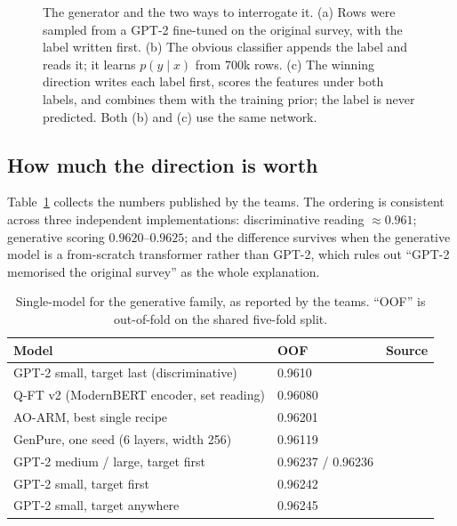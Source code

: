 \begin{figure}[t]
\caption{The generator and the two ways to interrogate it. (a) Rows were sampled from a
GPT-2 fine-tuned on the original survey, with the label written first. (b) The obvious
classifier appends the label and reads it; it learns $p(y\mid x)$ from 700k rows.
(c) The winning direction writes each label first, scores the features under both labels,
and combines them with the training prior; the label is never predicted. Both (b) and (c)
use the same network.}
\label{fig:directions}
\end{figure}


\subsection{How much the direction is worth}

Table~\ref{tab:generative} collects the numbers published by the teams. The ordering is
consistent across three independent implementations: discriminative reading $\approx0.961$;
generative scoring $0.9620$--$0.9625$; and the difference survives when the generative model
is a from-scratch transformer rather than GPT-2, which rules out ``GPT-2 memorised the
original survey'' as the whole explanation.

\begin{table}[t]
\centering
\small
\caption{Single-model \auc{} for the generative family, as reported by the teams.
``OOF'' is out-of-fold on the shared five-fold split.}
\label{tab:generative}
\begin{tabular}{lll}
\toprule
Model & OOF \auc{} & Source\\
\midrule
GPT-2 small, target last (discriminative)      & 0.9610            & \citet{kaggle_first}\\
Q-FT v2 (ModernBERT encoder, set reading)      & 0.96080           & \citet{kaggle_qft2}\\
AO-ARM, best single recipe                     & 0.96201           & \citet{kaggle_fourth}\\
GenPure, one seed (6 layers, width 256)        & 0.96119           & \citet{kaggle_seventh}\\
GPT-2 medium / large, target first             & 0.96237 / 0.96236 & \citet{kaggle_first}\\
GPT-2 small, target first                      & 0.96242           & \citet{kaggle_first}\\
GPT-2 small, target anywhere                   & 0.96245           & \citet{kaggle_first}\\
\bottomrule
\end{tabular}
\end{table}

